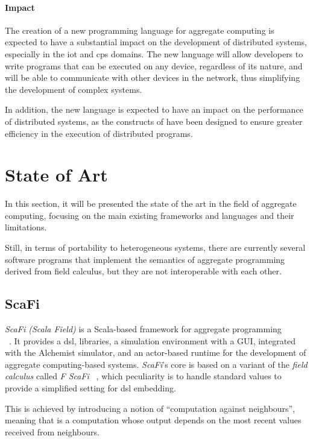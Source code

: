 \paragraph{Impact}
The creation of a new programming language for aggregate computing is expected to have a substantial impact on the
development of distributed systems, especially in the \ac{iot} and \ac{cps} domains.
The new language will allow developers to write programs that can be executed on any device, regardless of its nature,
and will be able to communicate with other devices in the network, thus simplifying the development of complex systems.

In addition, the new language is expected to have an impact on the performance of distributed systems, as the constructs
of \xc{} have been designed to ensure greater efficiency in the execution of distributed programs.

\section{State of Art}
\label{sec:state-of-art}

In this section, it will be presented the state of the art in the field of aggregate computing, focusing on the main existing
frameworks and languages and their limitations.

Still, in terms of portability to heterogeneous systems, there are currently several software programs that implement the
semantics of aggregate programming derived from field calculus, but they are not interoperable with each other.

\subsection{ScaFi}
\label{subsec:scafi}

\emph{ScaFi (Scala Field)} is a Scala-based framework for aggregate programming\\ ~\cite{CASADEI2022101248}.
It provides a \ac{dsl}, libraries, a simulation environment with a GUI, integrated with the
Alchemist simulator, and an actor-based runtime for the development of aggregate computing-based systems.
\emph{ScaFi}'s core is based on a variant of the \emph{field calculus} called \emph{F ScaFi} ~\cite{10.1007/978-3-030-61470-6_21},
which peculiarity is to handle standard values to provide a simplified setting for \ac{dsl} embedding.

This is achieved by introducing a notion of ``computation against neighbours'', meaning that is a computation whose
output depends on the most recent values received from neighbours.

